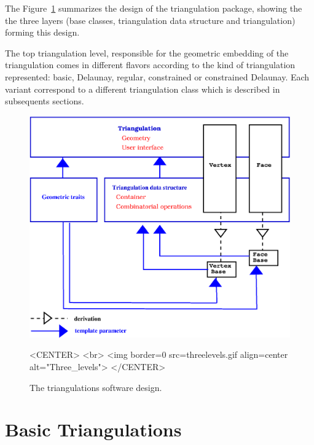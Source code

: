 The Figure~\ref{I1_Fig_three_levels} summarizes the design of the
triangulation package, showing the  the three layers
(base classes, triangulation data structure and triangulation)
forming this design.

The top triangulation  level, responsible for the geometric 
embedding of the  triangulation comes in different flavors 
according to the kind of triangulation represented:
basic, Delaunay, regular, constrained or constrained Delaunay.
Each variant correspond to a different triangulation class
which is described in subsequents
sections. 

\begin{figure}
\begin{ccTexOnly}
\begin{center}
\includegraphics[width=13cm]{threelevels.eps}
\end{center}
\end{ccTexOnly}
\caption{The triangulations software design.
\label{I1_Fig_three_levels}}
\begin{ccHtmlOnly}
<CENTER>
<br>
<img border=0 src=threelevels.gif align=center alt="Three_levels">
</CENTER>
\end{ccHtmlOnly}
\end{figure}



\section{Basic Triangulations}
\label{Section_2D_Triangulations_Basic}

